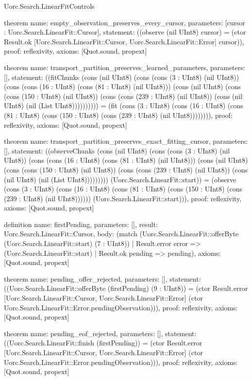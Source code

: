 \begin{lexlean}{Uorc.Search.LinearFitControls}
\begin{semanticmodule}
theorem{
  name: empty_observation_preserves_every_cursor,
  parameters: [cursor : Uorc.Search.LinearFit::Cursor],
  statement: ((observe (nil UInt8) cursor) = (ctor Result.ok [Uorc.Search.LinearFit::Cursor, Uorc.Search.LinearFit::Error] cursor)),
  proof: reflexivity{},
  axioms: [Quot.sound, propext]
}

theorem{
  name: transport_partition_preserves_learned_parameters,
  parameters: [],
  statement: ((fitChunks (cons (nil UInt8) (cons (cons (3 : UInt8) (nil UInt8)) (cons (cons (16 : UInt8) (cons (81 : UInt8) (nil UInt8))) (cons (nil UInt8) (cons (cons (150 : UInt8) (nil UInt8)) (cons (cons (239 : UInt8) (nil UInt8)) (cons (nil UInt8) (nil (List UInt8)))))))))) = (fit (cons (3 : UInt8) (cons (16 : UInt8) (cons (81 : UInt8) (cons (150 : UInt8) (cons (239 : UInt8) (nil UInt8)))))))),
  proof: reflexivity{},
  axioms: [Quot.sound, propext]
}

theorem{
  name: transport_partition_preserves_exact_fitting_cursor,
  parameters: [],
  statement: ((observeChunks (cons (nil UInt8) (cons (cons (3 : UInt8) (nil UInt8)) (cons (cons (16 : UInt8) (cons (81 : UInt8) (nil UInt8))) (cons (nil UInt8) (cons (cons (150 : UInt8) (nil UInt8)) (cons (cons (239 : UInt8) (nil UInt8)) (cons (nil UInt8) (nil (List UInt8))))))))) (Uorc.Search.LinearFit::start)) = (observe (cons (3 : UInt8) (cons (16 : UInt8) (cons (81 : UInt8) (cons (150 : UInt8) (cons (239 : UInt8) (nil UInt8)))))) (Uorc.Search.LinearFit::start))),
  proof: reflexivity{},
  axioms: [Quot.sound, propext]
}

definition{
  name: firstPending,
  parameters: [],
  result: Uorc.Search.LinearFit::Cursor,
  body: (match (Uorc.Search.LinearFit::offerByte (Uorc.Search.LinearFit::start) (7 : UInt8))
    | Result.error error => (Uorc.Search.LinearFit::start)
    | Result.ok pending => pending),
  axioms: [Quot.sound, propext]
}

theorem{
  name: pending_offer_rejected,
  parameters: [],
  statement: ((Uorc.Search.LinearFit::offerByte (firstPending) (9 : UInt8)) = (ctor Result.error [Uorc.Search.LinearFit::Cursor, Uorc.Search.LinearFit::Error] (ctor Uorc.Search.LinearFit::Error.pendingObservation))),
  proof: reflexivity{},
  axioms: [Quot.sound, propext]
}

theorem{
  name: pending_eof_rejected,
  parameters: [],
  statement: ((Uorc.Search.LinearFit::finish (firstPending)) = (ctor Result.error [Uorc.Search.LinearFit::Cursor, Uorc.Search.LinearFit::Error] (ctor Uorc.Search.LinearFit::Error.pendingObservation))),
  proof: reflexivity{},
  axioms: [Quot.sound, propext]
}


\end{semanticmodule}
\end{lexlean}
